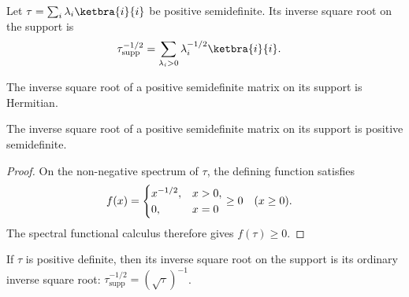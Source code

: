 \begin{definition}
    \label{def:support_inverse_square_root}
    \leanok
    Let $\tau=\sum_i\lambda_i\ketbra{i}{i}$ be positive semidefinite.
    Its inverse square root on the support is
    \begin{align}
        \tau^{-1/2}_{\mathrm{supp}}
        &=\sum_{\lambda_i>0}\lambda_i^{-1/2}\ketbra{i}{i}.
        \label{eq:entropy_support_inv_sqrt}
    \end{align}
\end{definition}

\begin{lemma}
    \label{lem:support_inverse_square_root_hermitian}
    \leanok
    The inverse square root of a positive semidefinite matrix on its support is
    Hermitian.
\end{lemma}

\begin{lemma}
    \label{lem:support_inverse_square_root_positive_semidefinite}
    \leanok
    The inverse square root of a positive semidefinite matrix on its support is
    positive semidefinite.
\end{lemma}

\begin{proof}\leanok
    On the non-negative spectrum of $\tau$, the defining function satisfies
    \begin{align}
        f(x)
        &=
        \begin{cases}
            x^{-1/2}, & x>0,\\
            0, & x=0
        \end{cases}
        \geq 0
        \quad (x\geq 0).
        \notag
    \end{align}
    The spectral functional calculus therefore gives $f(\tau)\geq 0$.
\end{proof}

\begin{lemma}
    \label{lem:support_inverse_square_root_positive_definite}
    \leanok
    If $\tau$ is positive definite, then its inverse square root on the support
    is its ordinary inverse square root:
    $\tau^{-1/2}_{\mathrm{supp}}=(\sqrt\tau)^{-1}$.
\end{lemma}

